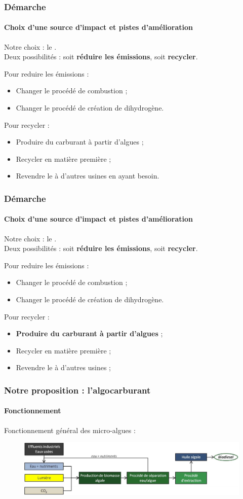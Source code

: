 \documentclass{beamer}
\begin{document}
	\begin{frame}
		\frametitle{Démarche}
		\framesubtitle{Choix d'une source d'impact et pistes d'amélioration} %
		Notre choix : le .\\
		Deux possibilités : soit \textbf{réduire les émissions}, soit \textbf{recycler}.
		
		Pour reduire les émissions :
		\begin{itemize}
			\item Changer le procédé de combustion ;
			\item Changer le procédé de création de dihydrogène.
		\end{itemize}
		Pour recycler :
		\begin{itemize}
			\item Produire du carburant à partir d'algues ;
			\item Recycler en matière première ;
			\item Revendre le  à d'autres usines
			en ayant besoin.
		\end{itemize}
	\end{frame}
	
		\begin{frame}
		\frametitle{Démarche}
		\framesubtitle{Choix d'une source d'impact et pistes d'amélioration} %
		Notre choix : le \chemform{CO_2}.\\
		Deux possibilités : soit \textbf{réduire les émissions}, soit \textbf{recycler}.
		
		Pour reduire les émissions :
		\begin{itemize}
			\item Changer le procédé de combustion ;
			\item Changer le procédé de création de dihydrogène.
		\end{itemize}
		Pour recycler :
		\begin{itemize}
			\item \textbf{Produire du carburant à partir d'algues} ;
			\item Recycler en matière première ;
			\item Revendre le  à d'autres usines ;
		\end{itemize}
	\end{frame}
	
	\begin{frame}
		\frametitle{Notre proposition : l'algocarburant}
		\framesubtitle{Fonctionnement}
		Fonctionnement général des micro-algues \cite{PrixAlgues} :
		\begin{figure}
			\centering
			\includegraphics[scale=0.45]{media/fonctionnement-v2.png}
		\end{figure}
	\end{frame}
	
\end{document}
